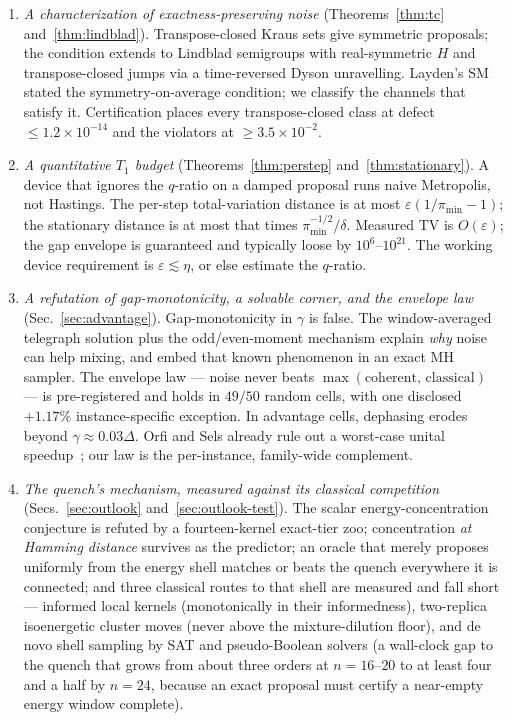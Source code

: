 \documentclass[aps,prx,reprint,floatfix,amsmath,amssymb,amsfonts]{revtex4-2}
\begin{document}
\begin{enumerate}
\item \emph{A characterization of exactness-preserving noise}
(Theorems~\ref{thm:tc} and~\ref{thm:lindblad}). Transpose-closed Kraus
sets give symmetric proposals; the condition extends to Lindblad
semigroups with real-symmetric $H$ and transpose-closed jumps via a
time-reversed Dyson unravelling. Layden's SM stated the
symmetry-on-average condition; we classify the channels that satisfy it.
Certification places every transpose-closed class at defect
$\le 1.2\times 10^{-14}$ and the violators at $\ge 3.5\times 10^{-2}$.

\item \emph{A quantitative $T_1$ budget}
(Theorems~\ref{thm:perstep} and~\ref{thm:stationary}). A device that
ignores the $q$-ratio on a damped proposal runs naive Metropolis, not
Hastings. The per-step total-variation distance is at most
$\varepsilon(1/\pi_{\min}-1)$; the stationary distance is at most that
times $\pi_{\min}^{-1/2}/\delta$. Measured TV is $O(\varepsilon)$; the
gap envelope is guaranteed and typically loose by $10^6$--$10^{21}$. The
working device requirement is $\varepsilon\lesssim\eta$, or else
estimate the $q$-ratio.

\item \emph{A refutation of gap-monotonicity, a solvable corner, and the
envelope law} (Sec.~\ref{sec:advantage}). Gap-monotonicity in $\gamma$
is false. The window-averaged telegraph solution plus the odd/even-moment
mechanism explain \emph{why} noise can help mixing, and embed that known
phenomenon in an exact MH sampler. The envelope law --- noise never
beats $\max(\text{coherent},\,\text{classical})$ --- is pre-registered
and holds in $49/50$ random cells, with one disclosed $+1.17\%$
instance-specific exception. In advantage cells, dephasing erodes beyond
$\gamma\approx 0.03\Delta$. Orfi and Sels already rule out a worst-case
unital speedup~\cite{OrfiSels2024}; our law is the per-instance,
family-wide complement.

\item \emph{The quench's mechanism, measured against its classical
competition} (Secs.~\ref{sec:outlook} and~\ref{sec:outlook-test}). The
scalar energy-concentration conjecture is refuted by a fourteen-kernel
exact-tier zoo; concentration \emph{at Hamming distance} survives as the
predictor; an oracle that merely proposes uniformly from the energy
shell matches or beats the quench everywhere it is connected; and three
classical routes to that shell are measured and fall short ---
informed local kernels (monotonically in their informedness),
two-replica isoenergetic cluster moves (never above the
mixture-dilution floor), and de novo shell sampling by SAT and
pseudo-Boolean solvers (a wall-clock gap to the quench that grows from
about three orders at $n=16$--$20$ to at least four and a half by
$n=24$, because an exact proposal must certify a near-empty energy
window complete).


\end{enumerate}
\end{document}
